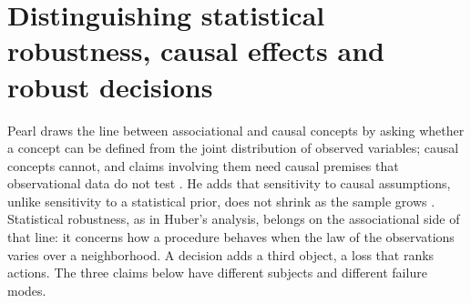 \section{Distinguishing statistical robustness, causal effects and robust decisions}
\label{sec:p15-w02b-p15-070-three-claims}

Pearl draws the line between associational and causal concepts by asking
whether a concept can be defined from the joint distribution of observed
variables; causal concepts cannot, and claims involving them need causal
premises that observational data do not test
\cite[Secs.~2.1--2.2, pp.~99--100]{Pearl2009CausalOverview}.
He adds that sensitivity to causal assumptions, unlike sensitivity to a
statistical prior, does not shrink as the sample grows
\cite[Sec.~2.4, p.~101]{Pearl2009CausalOverview}.
Statistical robustness, as in Huber's analysis, belongs on the
associational side of that line: it concerns how a procedure behaves when
the law of the observations varies over a neighborhood. A decision adds a
third object, a loss that ranks actions. The three claims below have
different subjects and different failure modes.

